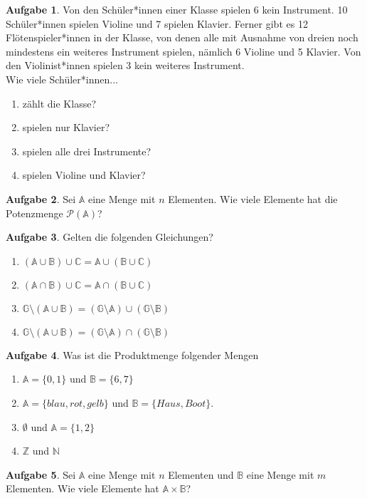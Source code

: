 \documentclass[11pt,a4paper]{article}
\newcommand{\C}{\mathbb{C}}
\newcommand{\N}{\mathbb{N}}
\newcommand{\A}{\mathbb{A}}
\newcommand{\B}{\mathbb{B}}
\newcommand{\G}{\mathbb{G}}
\newcommand{\Z}{\mathbb{Z}}
\theoremstyle{definition}
\newtheorem{aufg}{Aufgabe}
\begin{document}
\begin{aufg}
	Von den Schüler*innen einer Klasse spielen 6 kein Instrument. 10 Schüler*innen spielen Violine und 7 spielen Klavier. Ferner gibt es 12 Flötenspieler*innen in der Klasse, von denen alle mit Ausnahme von dreien noch mindestens ein weiteres Instrument spielen, nämlich 6 Violine und 5 Klavier. Von den Violinist*innen spielen 3 kein weiteres Instrument.\\
	Wie viele Schüler*innen...
	\begin{enumerate}[label=(\alph*)]
		\item zählt die Klasse?
		\item spielen nur Klavier?
		\item spielen alle drei Instrumente?
		\item spielen Violine und Klavier?
	\end{enumerate}
\end{aufg}

\begin{aufg}
	Sei $\A$ eine Menge mit $n$ Elementen. Wie viele Elemente hat die Potenzmenge $\mathcal{P}(\A)$?
\end{aufg}



\begin{aufg}
	Gelten die folgenden Gleichungen?
	\begin{enumerate}[label=(\alph*)]
		\item $(\A\cup\B)\cup\C=\A\cup(\B\cup\C)$
		\item $(\A\cap\B)\cup\C=\A\cap(\B\cup\C)$
		\item $\G\setminus(\A\cup\B)=(\G\setminus\A)\cup(\G\setminus\B)$
			\item $\G\setminus(\A\cup\B)=(\G\setminus\A)\cap(\G\setminus\B)$
	\end{enumerate}
\end{aufg}
	

\begin{aufg}
	Was ist die Produktmenge folgender Mengen
	\begin{enumerate}[label=(\alph*)]
		\item $\A=\{0,1\}$ und $\B=\{6,7\}$
		\item $\A=\{blau, rot, gelb\}$ und $\B=\{Haus, Boot\}$.
		\item $\emptyset$ und $\A=\{1,2\}$
		\item $\Z$ und $\N$
	\end{enumerate}
\end{aufg}

\begin{aufg}
		Sei $\A$ eine Menge mit $n$ Elementen und $\B$ eine Menge mit $m$ Elementen. Wie viele Elemente hat $\A\times\B$?
\end{aufg}
	
	
	
	
	
	
	
	
	
	
	
	
	
	
\end{document}
